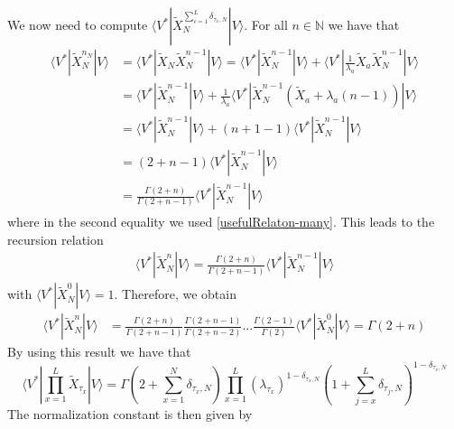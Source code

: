 \documentclass[10pt]{article}
\numberwithin{equation}{section}
\numberwithin{equation}{subsection}
\begin{document}
We now need to compute $\langle V^{*}|\widetilde{X}_{N}^{\sum_{i=1}^{L}\delta_{\tau_{x},N}}|V\rangle$. For all $n\in \mathbb{N}$ we have that  
\begin{align*}
	\langle V^{*}|\widetilde{X}_{N}^{n_{N}}|V\rangle&=\langle V^{*}|\widetilde{X}_{N}\widetilde{X}_{N}^{n-1}|V\rangle=\langle V^{*}|\widetilde{X}_{N}^{n-1}|V\rangle +\langle V^{*}|\frac{1}{\lambda_{a}}\widetilde{X}_{a}\widetilde{X}_{N}^{n-1}|V\rangle
	\\&=
	\langle V^{*}|\widetilde{X}_{N}^{n-1}|V\rangle+\frac{1}{\lambda_{a}}\langle V^{*}|\widetilde{X}_{N}^{n-1}\left(\widetilde{X}_{a}+\lambda_{a}(n-1)\right)|V\rangle
	\\&=
	\langle V^{*}|\widetilde{X}_{N}^{n-1}|V\rangle+\left(n+1-1\right)\langle V^{*}|\widetilde{X}_{N}^{n-1}|V\rangle
	\\&=
	\left(2+n-1\right)\langle V^{*}|\widetilde{X}_{N}^{n-1}|V\rangle
	\\&=
	\frac{\Gamma(2+n)}{\Gamma(2+n-1)}\langle V^{*}|\widetilde{X}_{N}^{n-1}|V\rangle
\end{align*}
where in the second equality we used \eqref{usefulRelaton-many}. 
This leads to the recursion relation
\begin{align}
		\langle V^{*}|\widetilde{X}_{N}^{n}|V\rangle=\frac{\Gamma(2+n)}{\Gamma(2+n-1)}\langle V^{*}|\widetilde{X}_{N}^{n-1}|V\rangle
\end{align}
with $	\langle V^{*}|\widetilde{X}_{N}^{0}|V\rangle=1$. 
Therefore, we obtain 
\begin{align*}
	\langle V^{*}|\widetilde{X}_{N}^{n}|V\rangle&=%
	\frac{\Gamma(2+n)}{\Gamma(2+n-1)}\frac{\Gamma(2+n-1)}{\Gamma(2+n-2)}\ldots \frac{\Gamma(2-1)}{\Gamma(2)}\langle V^{*}|\widetilde{X}_{N}^{0}|V\rangle=
	\Gamma(2+n)
\end{align*}
By using this result we have that
\begin{equation}
	\langle V^{*}|\prod_{x=1}^{L}\widetilde{X}_{\tau_{x}}
	|V \rangle=\Gamma(2+\sum_{x=1}^{N}\delta_{\tau_{x},N})\prod_{x=1}^{L}\left(\lambda_{\tau_{x}}\right)^{1-\delta_{\tau_{x},N}}\left(1+\sum_{j=x}^{L}\delta_{\tau_{j},N}\right)^{1-\delta_{\tau_{x},N}}
\end{equation}
The normalization constant is then given by
\end{document}
